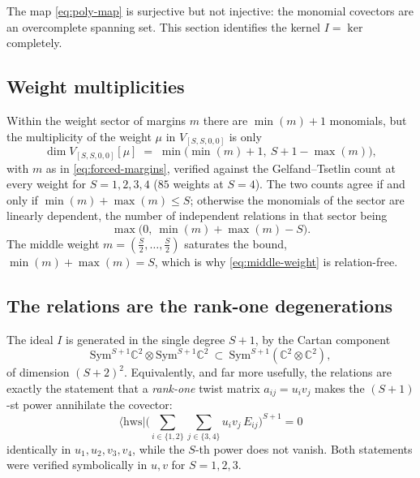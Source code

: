 \documentclass[12pt]{article}
\newcommand{\hws}{\mathrm{hws}}
\newcommand{\Sym}{\mathrm{Sym}}
\begin{document}
The map \eqref{eq:poly-map} is surjective but not injective: the monomial
covectors are an overcomplete spanning set. This section identifies the kernel
$I=\ker$ completely.

\subsection{Weight multiplicities}

Within the weight sector of margins $m$ there are $\min(m)+1$ monomials, but the
multiplicity of the weight $\mu$ in $V_{[S,S,0,0]}$ is only
\begin{equation}
\dim V_{[S,S,0,0]}[\mu] \;=\; \min\big(\min(m)+1,\ S+1-\max(m)\big),
\label{eq:multiplicity}
\end{equation}
with $m$ as in \eqref{eq:forced-margins}, verified against the
Gelfand--Tsetlin count at every weight for $S=1,2,3,4$ ($85$ weights at $S=4$).
The two counts agree if and only if $\min(m)+\max(m)\leq S$; otherwise the
monomials of the sector are linearly dependent, the number of independent
relations in that sector being
\begin{equation}
\max\big(0,\ \min(m)+\max(m)-S\big).
\label{eq:sector-deficit}
\end{equation}
The middle weight $m=(\tfrac{S}{2},\dots,\tfrac{S}{2})$ saturates the bound,
$\min(m)+\max(m)=S$, which is why \eqref{eq:middle-weight} is relation-free.

\subsection{The relations are the rank-one degenerations}

The ideal $I$ is generated in the single degree $S+1$, by the Cartan component
\begin{equation}
\Sym^{S+1}\mathbb{C}^2\otimes\Sym^{S+1}\mathbb{C}^2\ \subset\ \Sym^{S+1}(\mathbb{C}^2\otimes\mathbb{C}^2),
\end{equation}
of dimension $(S+2)^2$. Equivalently, and far more usefully, the relations are
exactly the statement that a \emph{rank-one} twist matrix $a_{ij}=u_iv_j$ makes
the $(S+1)$-st power annihilate the covector:
\begin{equation}
\boxed{\ \
\langle\hws|\Big(\sum_{i\in\{1,2\}}\sum_{j\in\{3,4\}} u_i v_j\,E_{ij}\Big)^{S+1}=0
\ \ }
\label{eq:rank-one}
\end{equation}
identically in $u_1,u_2,v_3,v_4$, while the $S$-th power does not vanish. Both
statements were verified symbolically in $u,v$ for $S=1,2,3$.
\end{document}
